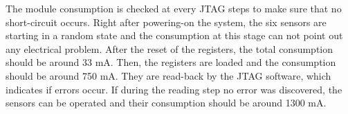   The module consumption is checked at every JTAG steps to make sure that no short-circuit occurs.
  Right after powering-on the system, the six sensors are starting in a random state and the consumption at this stage can not point out any electrical problem.
  After the reset of the registers, the total consumption should be around 33 mA.
  Then, the registers are loaded and the consumption should be around 750 mA.
  They are read-back by the JTAG software, which indicates if errors occur.
  If during the reading step no error was discovered, the sensors can be operated and their consumption should be around 1300 mA.



